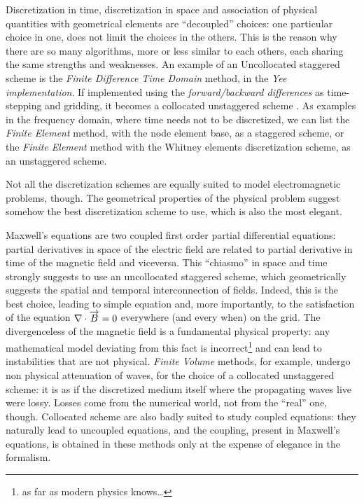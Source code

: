 Discretization in time, discretization in space and association of
physical quantities with geometrical elements are ``decoupled''
choices: one particular choice in one, does not limit the choices in
the others. This is the reason why there are so many algorithms, more
or less similar to each others, each sharing the same strengths and
weaknesses. An example of an Uncollocated staggered scheme is the
\emph{Finite Difference Time Domain} method, in the \emph{Yee
implementation}\cite{taflove_computational}. If implemented using the \emph{forward/backward
differences} as time-stepping and gridding, it becomes a collocated
unstaggered scheme . As examples in the frequency
domain, where time needs not to be discretized, we can list the
\emph{Finite Element} method, with the node element base, as a
staggered scheme, or the \emph{Finite Element} method with the Whitney
elements discretization scheme, as an unstaggered scheme.

Not all the discretization schemes are equally suited to model
electromagnetic problems, though. The geometrical properties of the
physical problem suggest somehow the best discretization scheme to
use, which is also the most elegant\cite{maxwell_mathematical}.


Maxwell's equations are two coupled first order partial differential
equations: partial derivatives in space of the electric field are
related to partial derivative in time of the magnetic field and
viceversa. This ``chiasmo'' in space and time strongly suggests to use
an uncollocated staggered scheme, which geometrically suggests the
spatial and temporal interconnection of fields. Indeed, this is the
best choice, leading to simple equation and, more importantly, to the
satisfaction of the equation ${\nabla \cdot \overrightarrow{B}} = 0$ everywhere (and every when)
on the grid. The divergenceless of the magnetic field is a fundamental
physical property: any mathematical model deviating from this fact is
incorrect\footnote{as far as modern physics knows\ldots {}} and can lead to instabilities that are not
physical. \emph{Finite Volume} methods, for
example\cite{taflove_advances}, undergo non physical attenuation of
waves, for the choice of a collocated unstaggered scheme: it is as if
the discretized medium itself where the propagating waves live were
lossy. Losses come from the numerical world, not from the ``real''
one, though. Collocated scheme are also badly suited to study coupled
equations: they naturally lead to uncoupled equations, and the
coupling, present in Maxwell's equations, is obtained in these methods
only at the expense of elegance in the formalism.

